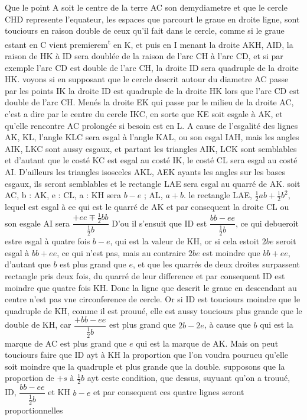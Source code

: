 \documentclass[11pt,a4paper]{article}
\begin{document}
Que le point A soit le centre de la terre AC son demydiametre et que le cercle CHD represente l'equateur, les espaces que parcourt le graue en droite ligne, sont touciours en raison double de ceux qu'il fait dans le cercle, comme si le graue estant en C vient premierem\textsuperscript{t} en K, et puis en I menant la droite AKH, AID, la raison de HK à ID sera doublée de la raison de l'arc CH à l'arc CD, et si par exemple l'arc CD est double de l'arc CH, la droite ID sera quadruple de la droite HK. voyons si en supposant que le cercle descrit autour du diametre AC passe par les points IK la droite ID est quadruple de la droite HK lors que l'arc CD est double de l'arc CH. Menés la droite EK qui passe par le milieu de la droite AC, c'est a dire par le centre du cercle IKC, en sorte que KE soit esgale à AK, et qu'elle rencontre AC prolongée si besoin est en L. A cause de l'esgalité des lignes AK, KL, l'angle KLC sera esgal à l'angle KAL, ou son esgal IAH, mais les angles AIK, LKC sont aussy esgaux, et partant les triangles AIK, LCK sont semblables et d'autant que le costé KC est esgal au costé IK, le costé CL sera esgal au costé AI. D'ailleurs les triangles isosceles AKL, AEK ayants les angles sur les bases esgaux, ils seront semblables et le rectangle  LAE sera esgal au quarré de AK. soit AC, b : AK, e : CL, a : KH sera $b - e$ ; AL, $a + b$. le rectangle LAE, $\frac{1}{2}ab + \frac{1}{2}b^{2}$, lequel est esgal à ee qui est le quarré de AK et par consequent la droite CL ou son esgale AI sera $\dfrac{+ee \mp \frac{1}{2}bb}{\frac{1}{2}b}$ D'ou il s'ensuit que ID est $\dfrac{bb - ee}{\frac{1}{2}b}$, ce qui debueroit estre esgal à quatre fois $b - e$, qui est la valeur de KH, or si cela estoit $2be$ seroit esgal à $bb + ee$, ce qui n'est pas, mais au contraire $2be$ est moindre que $bb + ee$, d'autant que $b$ est plus grand que $e$, et que les quarrés de deux droites surpassent   rectangle pris deux fois, du quarré de leur difference et par consequent ID est moindre que quatre fois KH. Donc la ligne que descrit le graue en descendant au centre n'est pas vne circonference de cercle. Or si ID est touciours moindre que le quadruple de KH, comme il est prouué, elle est aussy touciours plus grande que le double de  KH, car $\dfrac{+bb - ee}{\frac{1}{2}b}$ est plus grand que $2b - 2e$, à cause que $b$ qui est la marque de AC est plus grand que $e$ qui est la marque de AK. Mais on peut touciours faire que ID ayt à KH la proportion que l'on voudra pourueu qu'elle soit moindre que la quadruple et plus grande que la double. supposons que la proportion de $+s$ à $\frac{1}{2}b$ ayt ceste condition, que dessus, suyuant qu'on a trouué, ID, $\dfrac{bb - ee}{\frac{1}{2}b}$ et KH $b - e$ et par consequent ces quatre lignes seront proportionnelles
\end{document}
